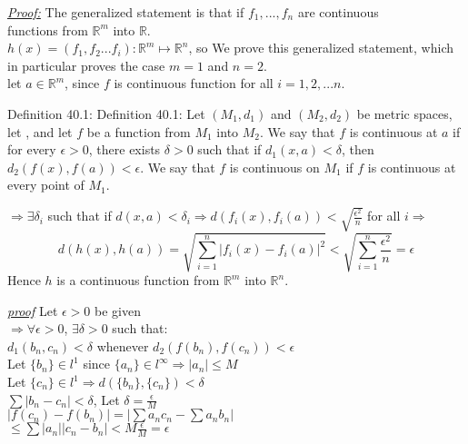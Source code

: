 \documentclass{amsbook}
\begin{document}
\begin{tcolorbox}[enhanced,attach boxed title to top center={yshift=-3mm,yshifttext=-1mm},
  colback=blue!5!white,colframe=blue!75!black,colbacktitle=red!80!black,
  title=Exercise 40.8:,fonttitle=\bfseries,
  boxed title style={size=small,colframe=red!50!black} ]
     \textit{\color{blue}\underline{Proof:}}
The generalized statement is that if $f_1,..., f_n$ are continuous\\ functions from $\mathbb{R}^m$ into 
$\mathbb{R}$.\\
$h(x)=(f_1,f_2...f_i):\mathbb{R}^m\longmapsto\mathbb{R}^n$, so We prove this generalized statement, which in 
particular proves the case $m=1$ and $n=2$.\\
let $a\in\mathbb{R}^m$, since $f$ is continuous function for all $i=1,2,...n$.
\begin{tcolorbox}[colback=red!5!white,colframe=red!75!black]
{\color{red}Definition 40.1:}
Definition 40.1: Let $(M_1,d_1)$ and $(M_2,d_2)$ be metric spaces, let , and let $f$ be a function from $M_1$ 
into $M_2$. We say that $f$ is continuous at 
$a$ if for every $\epsilon>0$, there exists $\delta>0$ such that if $d_1(x, a)<\delta$, then 
$d_2(f(x),f(a))<\epsilon$. We say that $f$ is continuous on 
$M_1$ if $f$ is continuous at every point of $M_1$.
 \end{tcolorbox}
 $\Longrightarrow\exists\delta_i$ such that if $d(x,a)<\delta_i\Rightarrow 
 d(f_i(x),f_i(a))<\sqrt{\frac{\epsilon^2}{n}}$ for all $i\Longrightarrow$
 $$d(h(x),h(a))=\sqrt{\sum_{i=1}^{n}|f_i(x)-f_i(a)|^2}<\sqrt{\sum_{i=1}^{n}\frac{\epsilon^2}{n}}=\epsilon$$
 Hence $h$ is a continuous function from $\mathbb{R}^m$ into $\mathbb{R}^n$.

\end{tcolorbox}



\begin{tcolorbox}[enhanced,attach boxed title to top center={yshift=-3mm,yshifttext=-1mm},
  colback=blue!5!white,colframe=blue!75!black,colbacktitle=red!80!black,
  title=Exercise 40.10:,fonttitle=\bfseries,
  boxed title style={size=small,colframe=red!50!black} ]
     \textit{\color{blue}\underline{proof}}
Let $\epsilon >0$ be given\\
$\Rightarrow \forall \epsilon>0$, $\exists \delta>0$ such that:\\
$d_1 (b_n,c_n)<\delta$ whenever $d_2 (f(b_n),f(c_n))<\epsilon$\\
Let $\{b_n\}\in l^1$ since $\{a_n\}\in l^\infty\Rightarrow |a_n|\leq M$\\
Let $\{c_n\}\in l^1\Rightarrow d(\{b_n\},\{c_n\})<\delta$\\
$\sum|b_n-c_n|<\delta$, Let $\delta=\frac{\epsilon}{M}$\\
$|f(c_n)-f(b_n)|=|\sum a_n c_n-\sum a_n b_n|$\\
$\leq\sum |a_n||c_n-b_n|<M\frac{\epsilon}{M}=\epsilon$
\end{tcolorbox}
\end{document}
